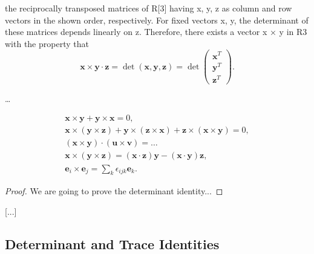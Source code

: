 the reciprocally transposed matrices of R[3] having x, y, z as column and row vectors in the shown order, respectively. For fixed vectors x, y, the determinant of these matrices depends linearly on z. Therefore, there exists a vector x × y in R3 with the property that
\[
    \mathbf{x} \times \mathbf{y} \cdot \mathbf{z} = \det(\mathbf{x}, \mathbf{y}, \mathbf{z}) = \det\begin{pmatrix}
        \textbf{x}^T \\
        \textbf{y}^T \\
        \textbf{z}^T
    \end{pmatrix}.
\]

\dots

\[
    \begin{aligned}
        \mathbf{x} \times \mathbf{y} + \mathbf{y} \times \mathbf{x} = 0,                                                                                            \\
        \mathbf{x} \times (\mathbf{y} \times \mathbf{z}) + \mathbf{y} \times (\mathbf{z} \times \mathbf{x}) + \mathbf{z} \times (\mathbf{x} \times \mathbf{y}) = 0, \\
        (\mathbf{x} \times \mathbf{y}) \cdot (\mathbf{u} \times \mathbf{v}) = \dots                                                                                 \\
        \mathbf{x} \times (\mathbf{y} \times \mathbf{z}) = (\mathbf{x} \cdot \mathbf{z}) \mathbf{y} - (\mathbf{x} \cdot \mathbf{y}) \mathbf{z},                     \\
        \mathbf{e}_i \times \mathbf{e}_j = \sum_k \epsilon_{ijk} \mathbf{e}_k.
    \end{aligned}
\]

\begin{proof}
    We are going to prove the determinant identity...
\end{proof}

[...]

\subsection{Determinant and Trace Identities}

